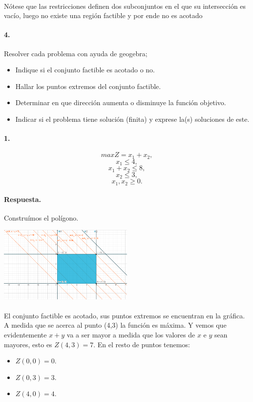 \documentclass{article}
\begin{document}
	\paragraph{} Nótese que las restricciones definen dos subconjuntos en el que su intersección es vacío, luego no existe una región factible y por ende no es acotado
	\paragraph{4.} Resolver cada problema con ayuda de geogebra;
	\begin{itemize}
		\item Indique si el conjunto factible es acotado o no.
		\item Hallar los puntos extremos del conjunto factible.
		\item Determinar en que dirección aumenta o disminuye la función objetivo.
		\item Indicar si el problema tiene solución (finita) y exprese la(s) soluciones de este. 
	\end{itemize}
	\paragraph{1.}
	$$max Z = x_1 + x_2,$$
	$$x_1 \leq 4,$$
	$$x_1 + x_2 \leq 8,$$
	$$x_2 \leq 3,$$
	$$x_1, x_2 \geq 0.$$
	\paragraph{Respuesta.} Construímos el polígono.
	\begin{center}
		\includegraphics[width=0.5\textwidth]{4-a}
	\end{center}
	\paragraph{} El conjunto factible es acotado, sus puntos extremos se encuentran en la gráfica. A medida que se acerca al punto (4,3) la función es máxima. Y vemos que evidentemente $x + y$ va a ser mayor a medida que los valores de $x$ e $y$ sean mayores, esto es $Z(4,3) = 7$. En el resto de puntos tenemos:
	\begin{itemize}
		\item $Z(0,0) = 0$.
		\item $Z(0,3) = 3$.
		\item $Z(4,0) = 4$.
	\end{itemize}
\end{document}
